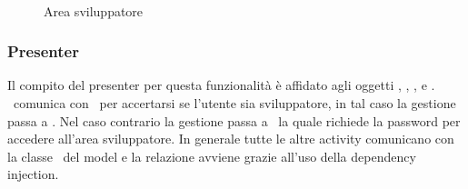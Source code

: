\documentclass[../Funzionalita.tex]{subfiles}
\begin{document}
			\begin{figure} [h]
				\centering
				
				 \quad
				\hspace{1.5cm}
				 \\
				\caption{Area sviluppatore}
			\end{figure}
			
	\newpage	
	\subsubsection{Presenter}
		Il compito del presenter per questa funzionalità è affidato agli oggetti \MainDeveloperPresenter, \DeveloperUnlockerActivity, \MainDeveloperActivity, \LoggingActivity e \LogInformationActivity.
		\MainDeveloperPresenter\ comunica con \Setting\ per accertarsi se l'utente sia sviluppatore, in tal caso la gestione passa a \MainDeveloperActivity. Nel caso contrario la gestione passa a \DeveloperUnlockerActivity\ la quale richiede la password per accedere all'area sviluppatore. In generale tutte le altre activity comunicano con la classe \InformationManagerImp\ del model e la relazione avviene grazie all'uso della dependency injection.
	
\end{document}
